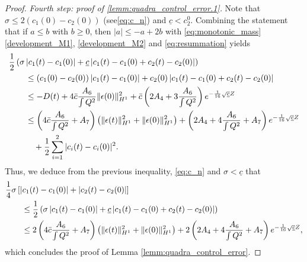 \documentclass[10pt,a4paper]{amsart}
\begin{document}
\begin{proof}
\medskip
\noindent \textit{Fourth step: proof of \eqref{lemm:quadra_control_error.1}.} Note that  $\sigma \leq 2(c_1(0)-c_2(0))$ (see\eqref{eq:c_n}) and $\underline{c} < c_2^0$. Combining the statement that if $a \leq b$ with $b \geq 0$, then $\vert a \vert \leq -a +2b$ with  \eqref{eq:monotonic_mass}  \eqref{development_M1}, \eqref{development_M2} and \eqref{eq:resummation} yields
		\begin{align*}
			\MoveEqLeft
			\frac12 \left(\sigma \left\vert c_1(t) -c_1(0) \right\vert + \underline{c} \left\vert c_1(t) - c_1(0) + c_2(t) - c_2(0) \right\vert \right)\\
			& \leq \left( c_1(0) -c_2(0) \right) \left\vert c_1(t) - c_1(0) \right\vert + c_2(0) \left\vert c_1(t) - c_1(0) + c_2(t) - c_2(0) \right\vert \\
			& \leq  -D(t) + 4 \bar{c} \frac{A_6}{\int Q^2}  \| \epsilon (0) \|_{H^1}^2 + \bar{c} \left( 2 A_4 + 3 \frac{A_6}{\int Q^2} \right) e^{- \frac1{16} \sqrt{\underline{c}} Z} \\
			& \leq \left( 4 \bar{c} \frac{A_6}{\int Q^2} + A_7 \right) \left( \| \epsilon (t) \|_{H^1}^2 + \| \epsilon (0) \|_{H^1}^2 \right) + \left( 2 A_4 + 4 \frac{A_6}{\int Q^2} + A_7 \right) e^{- \frac1{16} \sqrt{\underline{c}} Z} \\
   & \quad + \frac12 \sum_{i=1}^2 \vert c_i(t) - c_i(0) \vert^2.
		\end{align*}
		Thus, we deduce from the previous inequality, \eqref{eq:c_n} and $\sigma <\underline{c}$ that
		\begin{align*}
			\MoveEqLeft
			\frac14 \sigma \left[ \vert c_1(t)-c_1(0) \vert + \vert c_2(t)- c_2(0) \vert \right] \\
			& \leq \frac12 \left( \sigma \left\vert c_1(t) - c_1(0) \right\vert + \underline{c} \left\vert c_1(t)- c_1(0) + c_2(t) -c_2(0) \right\vert \right) \\
			& \leq 2\left( 4 \bar{c} \frac{A_6}{\int Q^2} +A_7 \right) \left( \| \epsilon (t) \|_{H^1}^2 + \| \epsilon (0) \|_{H^1}^2 \right) + 2 \left( 2 A_4 + 4 \frac{A_6}{\int Q^2} + A_7 \right) e^{- \frac1{16} \sqrt{\underline{c}} Z},
		\end{align*}
		which concludes the proof of Lemma \ref{lemm:quadra_control_error}.
	\end{proof}
\end{document}
